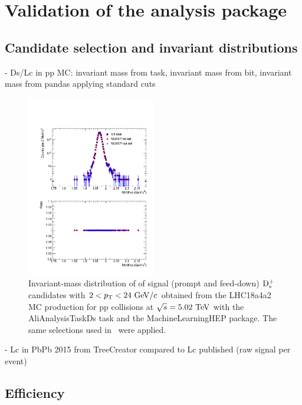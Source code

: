\section{Validation of the analysis package}
\label{sec:validation}

\subsection{Candidate selection and invariant distributions}
\label{subsec:invMassValidation}

- Ds/Lc in pp MC: invariant mass from task, invariant mass from bit, invariant mass from pandas applying standard cuts

\begin{figure}[tb]
\begin{center}
\includegraphics[width=0.5\textwidth]{figures/DsInvMassComparison.pdf}
\caption{Invariant-mass distribution of of signal (prompt and feed-down) $\rm D_s^+$ candidates with $2<p_{\rm T}<24~\mathrm{GeV}/c$ obtained from the LHC18a4a2 MC production for pp collisions at $\sqrt{s}=5.02~\mathrm{TeV}$ with the AliAnalysisTaskDs task and the MachineLearningHEP package. The same selections used in~\cite{Acharya:2019mgn} were applied.}
\label{fig:InvMassDsComparisonMCpp} 
\end{center}
\end{figure}

- Lc in PbPb 2015 from TreeCreator compared to Lc published (raw signal per event)

\subsection{Efficiency}
\label{subsec:effValidation}

